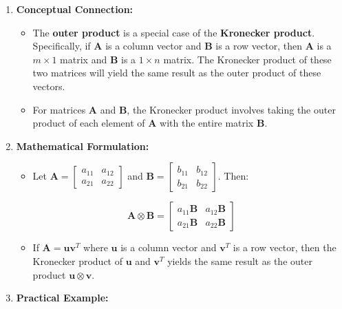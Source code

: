 \documentclass[
  letterpaper,
  DIV=11,
  numbers=noendperiod]{scrreprt}
\providecommand{\tightlist}{%
  \setlength{\itemsep}{0pt}\setlength{\parskip}{0pt}}\usepackage{longtable,booktabs,array}
\theoremstyle{plain}
\theoremstyle{definition}
\theoremstyle{remark}
\begin{document}
\begin{enumerate}
\def\labelenumi{\arabic{enumi}.}
\item
  \textbf{Conceptual Connection:}

  \begin{itemize}
  \item
    The \textbf{outer product} is a special case of the
    \textbf{Kronecker product}. Specifically, if \(\mathbf{A}\) is a
    column vector and \(\mathbf{B}\) is a row vector, then
    \(\mathbf{A}\) is a \(m \times 1\) matrix and \(\mathbf{B}\) is a
    \(1 \times n\) matrix. The Kronecker product of these two matrices
    will yield the same result as the outer product of these vectors.
  \item
    For matrices \(\mathbf{A}\) and \(\mathbf{B}\), the Kronecker
    product involves taking the outer product of each element of
    \(\mathbf{A}\) with the entire matrix \(\mathbf{B}\).
  \end{itemize}
\item
  \textbf{Mathematical Formulation:}

  \begin{itemize}
  \tightlist
  \item
    Let
    \(\mathbf{A} = \begin{bmatrix}a_{11} & a_{12}\\ a_{21} & a_{22}\end{bmatrix}\)
    and
    \(\mathbf{B} = \begin{bmatrix}b_{11} & b_{12}\\ b_{21} & b_{22}\end{bmatrix}\).
    Then:
  \end{itemize}

  \[
  \mathbf{A} \otimes \mathbf{B} = \begin{bmatrix}
  a_{11} \mathbf{B} & a_{12} \mathbf{B} \\
  a_{21} \mathbf{B} & a_{22} \mathbf{B}
  \end{bmatrix}
  \]

  \begin{itemize}
  \tightlist
  \item
    If \(\mathbf{A} = \mathbf{u} \mathbf{v}^T\) where \(\mathbf{u}\) is
    a column vector and \(\mathbf{v}^T\) is a row vector, then the
    Kronecker product of \(\mathbf{u}\) and \(\mathbf{v}^T\) yields the
    same result as the outer product \(\mathbf{u} \otimes \mathbf{v}\).
  \end{itemize}
\item
  \textbf{Practical Example:}


\end{enumerate}
\end{document}
